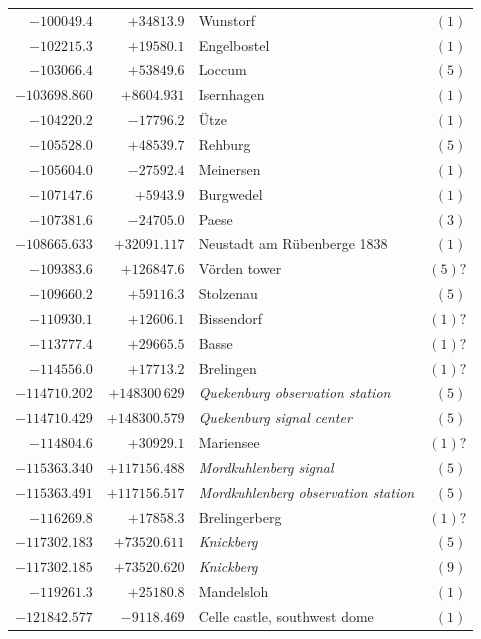\begin{center}
\begin{tabular}{r|r|p{170pt}|r}
\(-100049.4\)&\(+34813.9\)&Wunstorf&\((1)\)\\
\(-102215.3\)&\(+19580.1\)&Engelbostel&\((1)\)\\
\(-103066.4\)&\(+53849.6\)&Loccum&\((5)\)\\
\(-103698.860\)&\(+8604.931\)&Isernhagen&\((1)\)\\
\(-104220.2\)&\(-17796.2\)&Ütze&\((1)\)\\
\(-105528.0\)&\(+48539.7\)&Rehburg&\((5)\)\\
\(-105604.0\)&\(-27592.4\)&Meinersen&\((1)\)\\
\(-107147.6\)&\(+5943.9\)&Burgwedel&\((1)\)\\
\(-107381.6\)&\(-24705.0\)&Paese&\((3)\)\\
\(-108665.633\)&\(+32091.117\)&Neustadt am Rübenberge 1838&\((1)\)\\
\(-109383.6\)&\(+126847.6\)&Vörden tower&\((5)?\)\\
\(-109660.2\)&\(+59116.3\)&Stolzenau&\((5)\)\\
\(-110930.1\)&\(+12606.1\)&Bissendorf&\((1)?\)\\
\(-113777.4\)&\(+29665.5\)&Basse&\((1)?\)\\
\(-114556.0\)&\(+17713.2\)&Brelingen&\((1)?\)\\
\(-114710.202\)&\(+148300\,629\)&\textit{Quekenburg observation station}&\((5)\)\\
\(-114710.429\)&\(+148300.579\)&\textit{Quekenburg signal center}&\((5)\)\\
\(-114804.6\)&\(+30929.1\)&Mariensee&\((1)?\)\\
\(-115363.340\)&\(+117156.488\)&\textit{Mordkuhlenberg signal}&\((5)\)\\
\(-115363.491\)&\(+117156.517\)&\textit{Mordkuhlenberg observation station}&\((5)\)\\
\(-116269.8\)&\(+17858.3\)&Brelingerberg&\((1)?\)\\
\(-117302.183\)&\(+73520.611\)&\textit{Knickberg}&\((5)\)\\
\(-117302.185\)&\(+73520.620\)&\textit{Knickberg}&\((9)\)\\
\(-119261.3\)&\(+25180.8\)&Mandelsloh&\((1)\)\\
\(-121842.577\)&\(-9118.469\)&Celle castle, southwest dome&\((1)\)\\
\hline\end{tabular}\endgroup\end{center}
